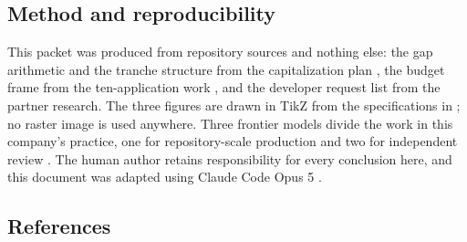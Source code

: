 \subsection{Method and reproducibility}

This packet was produced from repository sources and nothing else: the gap
arithmetic and the tranche structure from the capitalization plan
\cite{capitalplan2026}, the budget frame from the ten-application work
\cite{tenapps2026}, and the developer request list from the partner research. The
three figures are drawn in TikZ from the specifications in
; no raster image is used anywhere.
Three frontier models divide the work in this company's practice, one for
repository-scale production and two for independent review \cite{tripartisan2026}.
The human author retains responsibility for every conclusion here, and this
document was adapted using Claude Code Opus 5 \cite{repo2026}.

\subsection{References}

\begin{apprefs}


\end{apprefs}
